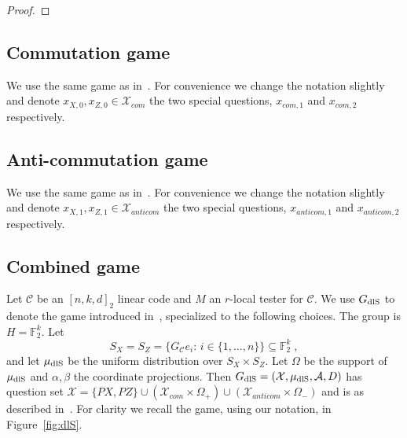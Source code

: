 \documentclass[11pt]{article}
\theoremstyle{definition}
\newcommand{\code}{\mathcal{C}}
\DeclareMathOperator*{\Expectation}{\mathbb{E}}
\newcommand{\Es}[1]{\Expectation_{#1}}
\newcommand{\field}{\mathbb{F}_2}
\newcommand{\dlS}{\ensuremath{\rm dlS}}
\newcommand{\mA}{\ensuremath{\mathcal{A}}}
\newcommand{\mM}{\ensuremath{\mathcal{M}}}
\newcommand{\mX}{\ensuremath{\mathcal{X}}}
\newcommand{\mN}{\mathcal{N}}
\begin{document}
\begin{proof}
\end{proof}


\subsection{Commutation game}

We use the same game as in~\cite[Section 3.1]{de2022spectral}. For convenience we change the notation slightly and denote $x_{X,0}, x_{Z,0} \in \mX_{com}$ the two special questions, $x_{com,1}$ and $x_{com,2}$ respectively. 

\subsection{Anti-commutation game}

We use the same game as in~\cite[Section 3.2]{de2022spectral}. For convenience we change the notation slightly and  denote $x_{X,1}, x_{Z,1} \in \mX_{anticom}$ the two special questions, $x_{anticom,1}$ and $x_{anticom,2}$ respectively. 

\subsection{Combined game}

Let $\code$ be an $[n,k,d]_2$ linear code and $M$ an $r$-local tester for $\code$. 
We use $G_{\dlS}$ to denote the game introduced in~\cite[Section 3.4]{de2022spectral}, specialized to the following choices. The group is $H=\field^k$. Let
\[ S_X=S_Z=\{G_\code e_i:\,i\in\{1,\ldots,n\}\}\subseteq \field^k\;,\]
and let $\mu_{\dlS}$ be the uniform distribution over $S_X\times S_Z$. Let $\Omega$ be the support of $\mu_{\dlS}$ and $\alpha,\beta$ the coordinate projections. Then $G_{\dlS}=(\mX,\mu_{\dlS},\mA,D)$ has question set $\mX = \{PX,PZ\} \cup (\mX_{com}\times \Omega_+) \cup (\mX_{anticom} \times \Omega_-)$ and is as described in~\cite[Section 3.4]{de2022spectral}. For clarity we recall the game, using our notation, in Figure~\ref{fig:dlS}. 
\end{document}
